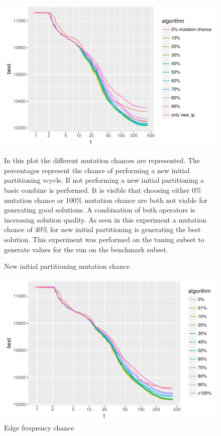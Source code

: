 \documentclass[a4paper,12pt,bibtotoc,titlepage, liststotoc,BCOR7mm,headsepline,pointlessnumbers]{scrbook}
\numberwithin{equation}{section}
\begin{document}
\begin{figure}
\caption{New initial partitioning mutation chance}
\begin{center}
\includegraphics{bachelorarbeit-newipmutationchance}
\end{center}
In this plot the different mutation chances are represented. The percentages represent the chance of performing a new initial partitioning vcycle. If not performing a new initial partitioning a basic combine is performed. It is visible that choosing either 0\% mutation chance or 100\% mutation chance are both not viable for generating good solutions. A combination of both operators is increasing solution quality. As seen in this experiment a mutation chance of 40\% for new initial partitioning is generating the best solution. This experiment was performed on the tuning subset to generate values for the run on the benchmark subset. 
\end{figure}


\begin{figure}
\caption{Edge frequency chance}
\begin{center}
\includegraphics{bachelorarbeit-edgefrequencytuning}
\end{center}

\end{figure}
\end{document}
